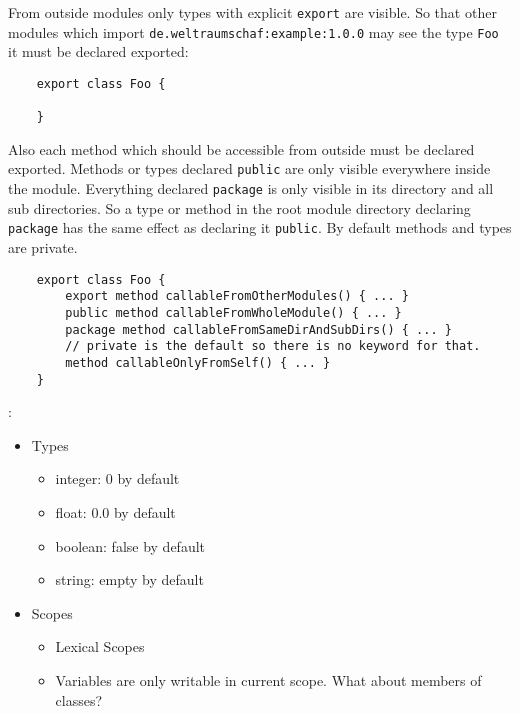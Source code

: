 \documentclass[a4paper,12pt]{article}
\begin{document}
From outside modules only types with explicit \verb|export| are visible. So that other modules which import \verb|de.weltraumschaf:example:1.0.0| may see the type \verb|Foo| it must be declared exported:
\begin{verbatim}
	export class Foo {
	
	}
\end{verbatim}

Also each method which should be accessible from outside must be declared exported. Methods or types declared \verb|public| are only visible everywhere inside the module. Everything declared \verb|package| is only visible in its directory and all sub directories. So a type or method in the root module directory declaring \verb|package| has the same effect as declaring it \verb|public|. By default methods and types are private.

\begin{verbatim}
	export class Foo {
	    export method callableFromOtherModules() { ... }
	    public method callableFromWholeModule() { ... }
	    package method callableFromSameDirAndSubDirs() { ... }
	    // private is the default so there is no keyword for that.
	    method callableOnlyFromSelf() { ... }
	}
\end{verbatim}

:

\begin{itemize}
	\item Types
  	\begin{itemize}
  		\item integer: 0 by default
  		\item float: 0.0 by default
  		\item boolean: false by default
  		\item string: empty by default
  	\end{itemize} 
  	\item Scopes
  	\begin{itemize}
  		\item Lexical Scopes
  		\item Variables are only writable in current scope. What about members of classes?
  	\end{itemize}
\end{itemize}

\newpage
\end{document}
